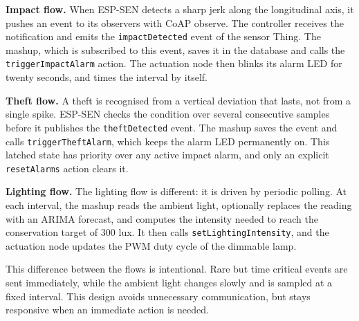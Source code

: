 \documentclass[conference]{IEEEtran}
\begin{document}
\textbf{Impact flow.} When ESP-SEN detects a sharp jerk along the longitudinal axis, it pushes an event to its observers with CoAP observe. The controller receives the notification and emits the \texttt{impactDetected} event of the sensor Thing. The mashup, which is subscribed to this event, saves it in the database and calls the \texttt{triggerImpactAlarm} action. The actuation node then blinks its alarm LED for twenty seconds, and times the interval by itself.

\textbf{Theft flow.} A theft is recognised from a vertical deviation that lasts, not from a single spike. ESP-SEN checks the condition over several consecutive samples before it publishes the \texttt{theftDetected} event. The mashup saves the event and calls \texttt{triggerTheftAlarm}, which keeps the alarm LED permanently on. This latched state has priority over any active impact alarm, and only an explicit \texttt{resetAlarms} action clears it.

\textbf{Lighting flow.} The lighting flow is different: it is driven by periodic polling. At each interval, the mashup reads the ambient light, optionally replaces the reading with an ARIMA forecast, and computes the intensity needed to reach the conservation target of $300$ lux. It then calls \texttt{setLightingIntensity}, and the actuation node updates the PWM duty cycle of the dimmable lamp.

This difference between the flows is intentional. Rare but time critical events are sent immediately, while the ambient light changes slowly and is sampled at a fixed interval. This design avoids unnecessary communication, but stays responsive when an immediate action is needed.
\end{document}
